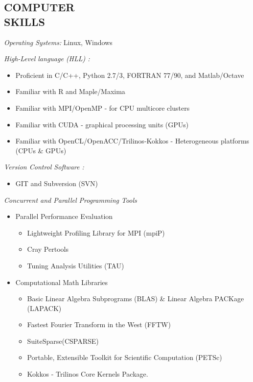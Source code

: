 \documentclass[margin]{res}
\begin{document}
\begin{resume}
\section{COMPUTER \\ SKILLS}
{\sl Operating Systems:} Linux, Windows%

{\sl High-Level language (HLL) :} %
  \begin{itemize}  \itemsep -1pt 
      \item Proficient in C/C++, Python 2.7/3, FORTRAN 77/90, and Matlab/Octave 
      \item Familiar with R and Maple/Maxima
      \item Familiar with MPI/OpenMP - for CPU multicore clusters
      \item Familiar with CUDA - graphical processing units (GPUs)
      \item Familiar with OpenCL/OpenACC/Trilinos-Kokkos - Heterogeneous platforms (CPUs \& GPUs)     
    \end{itemize}

{\sl Version Control Software :} %
  \begin{itemize}  \itemsep -1pt 
      \item GIT and Subversion (SVN) 
    \end{itemize}    
    
{\sl Concurrent and Parallel Programming Tools}%
  \begin{itemize}  \itemsep -1pt 
   \item Parallel Performance Evaluation
  \begin{itemize}  \itemsep -1pt  
      \item Lightweight Profiling Library for MPI (mpiP)
      \item Cray Pertools
      \item Tuning Analysis Utilities (TAU)
    \end{itemize}
   \item Computational Math Libraries
  \begin{itemize}  \itemsep -1pt  
      \item Basic Linear Algebra Subprograms (BLAS) \& Linear Algebra PACKage (LAPACK)   
      \item Fastest Fourier Transform in the West (FFTW)
      \item SuiteSparse(CSPARSE)
      \item Portable, Extensible Toolkit for Scientific Computation (PETSc)
      \item Kokkos - Trilinos Core Kernels Package.
    \end{itemize}
  \end{itemize}    
    

\end{resume}
\end{document}
